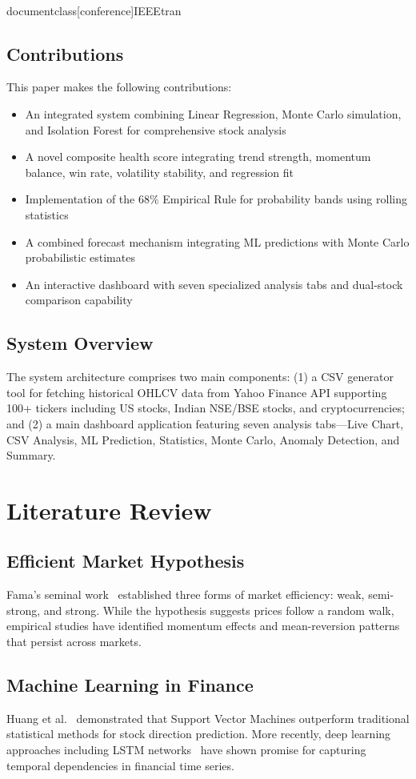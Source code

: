 \\documentclass[conference]{IEEEtran}
\begin{document}
\subsection{Contributions}
This paper makes the following contributions:
\begin{itemize}
    \item An integrated system combining Linear Regression, Monte Carlo simulation, and Isolation Forest for comprehensive stock analysis
    \item A novel composite health score integrating trend strength, momentum balance, win rate, volatility stability, and regression fit
    \item Implementation of the 68\% Empirical Rule for probability bands using rolling statistics
    \item A combined forecast mechanism integrating ML predictions with Monte Carlo probabilistic estimates
    \item An interactive dashboard with seven specialized analysis tabs and dual-stock comparison capability
\end{itemize}

\subsection{System Overview}
The system architecture comprises two main components: (1) a CSV generator tool for fetching historical OHLCV data from Yahoo Finance API supporting 100+ tickers including US stocks, Indian NSE/BSE stocks, and cryptocurrencies; and (2) a main dashboard application featuring seven analysis tabs---Live Chart, CSV Analysis, ML Prediction, Statistics, Monte Carlo, Anomaly Detection, and Summary.

\section{Literature Review}

\subsection{Efficient Market Hypothesis}
Fama's seminal work~\cite{fama1970} established three forms of market efficiency: weak, semi-strong, and strong. While the hypothesis suggests prices follow a random walk, empirical studies have identified momentum effects and mean-reversion patterns that persist across markets.

\subsection{Machine Learning in Finance}
Huang et al.~\cite{huang2005} demonstrated that Support Vector Machines outperform traditional statistical methods for stock direction prediction. More recently, deep learning approaches including LSTM networks~\cite{fischer2018} have shown promise for capturing temporal dependencies in financial time series.
\end{document}
